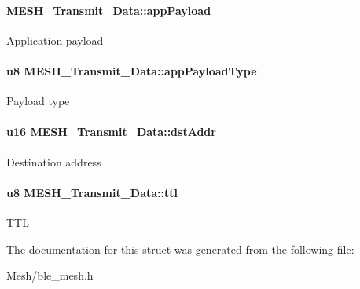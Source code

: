 \paragraph[{\texorpdfstring{app\+Payload}{appPayload}}]{ M\+E\+S\+H\+\_\+\+Transmit\+\_\+\+Data\+::app\+Payload}\hypertarget{struct_m_e_s_h___transmit___data_a749297c8cd07247a34d56561ffe1970c}{}\label{struct_m_e_s_h___transmit___data_a749297c8cd07247a34d56561ffe1970c}
Application payload 
\paragraph[{\texorpdfstring{app\+Payload\+Type}{appPayloadType}}]{\setlength{\rightskip}{0pt plus 5cm}u8 M\+E\+S\+H\+\_\+\+Transmit\+\_\+\+Data\+::app\+Payload\+Type}\hypertarget{struct_m_e_s_h___transmit___data_a9a27a301158fadc7680b6c7bf06748b9}{}\label{struct_m_e_s_h___transmit___data_a9a27a301158fadc7680b6c7bf06748b9}
Payload type 
\paragraph[{\texorpdfstring{dst\+Addr}{dstAddr}}]{\setlength{\rightskip}{0pt plus 5cm}u16 M\+E\+S\+H\+\_\+\+Transmit\+\_\+\+Data\+::dst\+Addr}\hypertarget{struct_m_e_s_h___transmit___data_a1bdc34f38d6429b5a63722191881af5b}{}\label{struct_m_e_s_h___transmit___data_a1bdc34f38d6429b5a63722191881af5b}
Destination address 
\paragraph[{\texorpdfstring{ttl}{ttl}}]{\setlength{\rightskip}{0pt plus 5cm}u8 M\+E\+S\+H\+\_\+\+Transmit\+\_\+\+Data\+::ttl}\hypertarget{struct_m_e_s_h___transmit___data_a11321e1d4fff77e8708480f9b9801be0}{}\label{struct_m_e_s_h___transmit___data_a11321e1d4fff77e8708480f9b9801be0}
T\+TL 

The documentation for this struct was generated from the following file\+:\begin{DoxyCompactItemize}
\item 
Mesh/ble\+\_\+mesh.\+h\end{DoxyCompactItemize}
